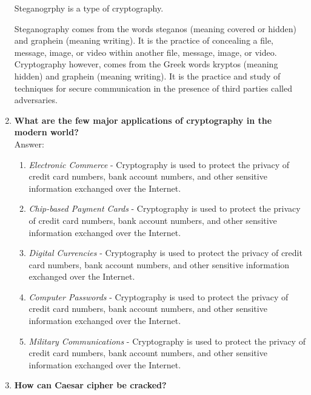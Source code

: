 \documentclass[openany]{book}
\begin{document}
\begin{enumerate}
	      Steganogrphy is a type of cryptography.

	      Steganography comes from the words steganos (meaning covered or hidden) and graphein (meaning writing). It is the practice of concealing a file, message, image, or video within another file, message, image, or video.\\

	      Cryptography however, comes from the Greek words kryptos (meaning hidden) and graphein (meaning writing). It is the practice and study of techniques for secure communication in the presence of third parties called adversaries.\\

	\item \textbf{What are the few major applications of cryptography in the modern world?}\\
	      Answer:
	      \begin{enumerate}
		      \item \textit{Electronic Commerce} - Cryptography is used to protect the privacy of credit card numbers, bank account numbers, and other sensitive information exchanged over the Internet.
		      \item \textit{Chip-based Payment Cards} - Cryptography is used to protect the privacy of credit card numbers, bank account numbers, and other sensitive information exchanged over the Internet.
		      \item \textit{Digital Currencies} - Cryptography is used to protect the privacy of credit card numbers, bank account numbers, and other sensitive information exchanged over the Internet.
		      \item \textit{Computer Passwords} - Cryptography is used to protect the privacy of credit card numbers, bank account numbers, and other sensitive information exchanged over the Internet.
		      \item \textit{Military Communications} - Cryptography is used to protect the privacy of credit card numbers, bank account numbers, and other sensitive information exchanged over the Internet.
	      \end{enumerate}

	\item \textbf{How can Caesar cipher be cracked?}\\


\end{enumerate}
\end{document}
